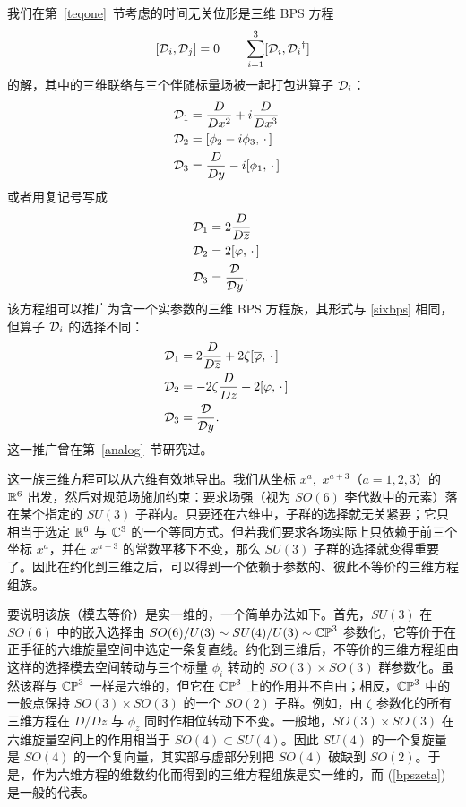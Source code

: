 我们在第~\ref{teqone}~节考虑的时间无关位形是三维 BPS 方程
\begin{equation} \label{sixbps}
[{\mathcal D}_i, {\mathcal D}_j]=0 \qquad  \sum_{i=1}^3[{\mathcal D}_i,{\mathcal D}_i{}^\dagger]
\end{equation}
的解，其中的三维联络与三个伴随标量场被一起打包进算子 ${\mathcal D}_i$：
\begin{align} {\mathcal D}_1 & = \frac{D}{Dx^2}+i\frac{D}{Dx^3}    \cr
                                   {\mathcal D}_2 & = [\phi_2-i\phi_3,\,\cdot\,] \cr
                             {\mathcal D}_3 & = \frac{D}{Dy}-i[\phi_1,\,\cdot\,]  \end{align}
或者用复记号写成
\begin{align}\label{oggi} {\mathcal D}_1 & =2\frac{D}{D\overline z} \cr
                                                              {\mathcal D}_2 & = 2[\varphi,\,\cdot\,]\cr
                                                               {\mathcal D}_3& = \frac{{\mathcal D}}{{\mathcal D} y}. \end{align}
该方程组可以推广为含一个实参数的三维 BPS 方程族，其形式与 \ref{sixbps} 相同，但算子 ${\mathcal D}_i$ 的选择不同：
\begin{align}\label{bpszeta}{\mathcal D}_1 & =2\frac{D}{D\overline z}  +2 \zeta [\overline \varphi,\,\cdot\,] \cr
                                                              {\mathcal D}_2 & = - 2 \zeta \frac{D}{D z} + 2[\varphi,\,\cdot\,]\cr
                                                               {\mathcal D}_3& = \frac{{\mathcal D}}{{\mathcal D} y}. \end{align}
这一推广曾在第~\ref{analog}~节研究过。



这一族三维方程可以从六维有效地导出。我们从坐标 $x^a,$ $x^{a+3}$（$a=1,2,3$）的 ${\mathbb R}^6$ 出发，然后对规范场施加约束：要求场强（视为 $SO(6)$ 李代数中的元素）落在某个指定的 $SU(3)$ 子群内。只要还在六维中，子群的选择就无关紧要；它只相当于选定 ${\mathbb R}^6$ 与 ${\mathbb C}^3$ 的一个等同方式。但若我们要求各场实际上只依赖于前三个坐标 $x^a$，并在 $x^{a+3}$ 的常数平移下不变，那么 $SU(3)$ 子群的选择就变得重要了。因此在约化到三维之后，可以得到一个依赖于参数的、彼此不等价的三维方程组族。



要说明该族（模去等价）是实一维的，一个简单办法如下。首先，$SU(3)$ 在 $SO(6)$ 中的嵌入选择由 $SO(6)/U(3)\sim SU(4)/U(3) \sim {\mathbb{CP}}^3$ 参数化，它等价于在正手征的六维旋量空间中选定一条复直线。约化到三维后，不等价的三维方程组由这样的选择模去空间转动与三个标量 $\phi_i$ 转动的 $SO(3) \times SO(3)$ 群参数化。虽然该群与 ${\mathbb{CP}}^3$ 一样是六维的，但它在 ${\mathbb{CP}}^3$ 上的作用并不自由；相反，${\mathbb{CP}}^3$ 中的一般点保持 $SO(3)\times SO(3)$ 的一个 $SO(2)$ 子群。例如，由 $\zeta$ 参数化的所有三维方程在 $D/Dz$ 与 $\phi_z$ 同时作相位转动下不变。一般地，$SO(3) \times SO(3)$ 在六维旋量空间上的作用相当于 $SO(4) \subset SU(4)$。因此 $SU(4)$ 的一个复旋量是 $SO(4)$ 的一个复向量，其实部与虚部分别把 $SO(4)$ 破缺到 $SO(2)$。于是，作为六维方程的维数约化而得到的三维方程组族是实一维的，而 (\ref{bpszeta}) 是一般的代表。

